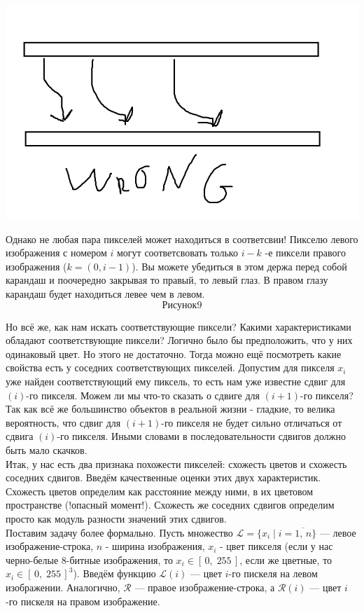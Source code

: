 	\includegraphics[scale = 0.75]{8}

	Однако не любая пара пикселей может находиться в соответсвии! Пикселю левого изображения с номером $i$ могут соответсвовать только $i-k$ -е  пиксели правого изображения ($k = (0,i-1)$). Вы можете убедиться в этом держа перед собой карандаш и поочередно закрывая то правый, то левый глаз. В правом глазу карандаш будет находиться левее чем в левом.
	$$Рисунок 9$$
	
	
	Но всё же, как нам искать соответствующие пиксели? Какими характеристиками обладают соответствующие пиксели? Логично было бы предположить, что у них одинаковый цвет. Но этого не достаточно. Тогда можно ещё посмотреть какие свойства есть у соседних соответствующих пикселей. Допустим для пикселя $x_{i}$ уже найден соответствующий ему пиксель, то есть нам уже известне сдвиг для $(i)$-го пикселя. Можем ли мы что-то сказать о сдвиге для $(i+1)$-го пикселя? Так как всё же большинство объектов в реальной жизни - гладкие, то велика вероятность, что сдвиг для $(i+1)$-го пикселя не будет сильно отличаться от сдвига $(i)$-го пикселя. Иными словами в последовательности сдвигов должно быть мало скачков.\\
	
	Итак, у нас есть два признака похожести пикселей: схожесть цветов и схожесть соседних сдвигов. Введём качественные оценки этих двух характеристик. Схожесть цветов определим как расстояние между ними, в их цветовом пространстве (!опасный момент!). Схожесть же соседних сдвигов определим просто как модуль разности значений этих сдвигов.\\
	
	Поставим задачу более формально. Пусть множество 
	$\mathcal{L} = \{x_i \; | \; i = \overline{1,\, n}\}$ --- левое изображение-строка, $n$ - ширина изображения, $x_i$ - цвет пикселя (если у нас черно-белые 8-битные изображения, то $x_i \in [ \, 0, \; 255 \,]$, если же цветные, то $x_i \in {[ \, 0, \; 255 \,]}^3$). Введём функцию $\mathcal{L}(i)$ --- цвет $i$-го пискеля на левом изображении. Аналогично, $\mathcal{R}$ --- правое изображение-строка, а $\mathcal{R}(i)$ --- цвет $i$-го пискеля на правом изображение.
	
